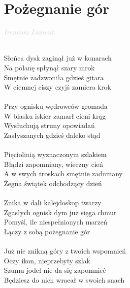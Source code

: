 \documentclass[a5paper, 10pt]{book}
\begin{document}
\section{Pożegnanie gór}\textcolor{lightgray}{\textit{Ireneusz Lament}}\\~\\
\begin{minipage}[t]{0.8\textwidth}
Słońca dysk zaginął już w konarach	\\
Na polanę spłynął szary mrok		\\
Smętnie zadzwoniła gdzieś gitara	\\
W ciemnej ciszy czyjś zamiera krok	\\
\\
Przy ognisku wędrowców gromada\\
W blasku iskier zamarł cieni krąg\\
Wysłuchują struny opowiadań\\
Zasłyszanych gdzieś daleko stąd\\
\\
Pięciolinią wyznaczonym szlakiem				\\
Błądzi zapomniany, wieczny cień				\\
A w swych troskach smętnie zadumany			\\
Żegna świątek odchodzący dzień			\\
\\
Znika w dali kalejdoskop twarzy\\
Zgasłych ognisk dym już sięga chmur\\
Pomyśl, ile niespełnionych marzeń\\
Łączy z sobą pożegnanie gór\\
\\
Już nie znikną góry z twoich wspomnień\\
Oczy ikon, nieprzebyty szlak\\
Szumu jodeł nie da się zapomnieć\\
Będziesz do nich wracał w swoich snach\\
\end{minipage}
\end{document}
